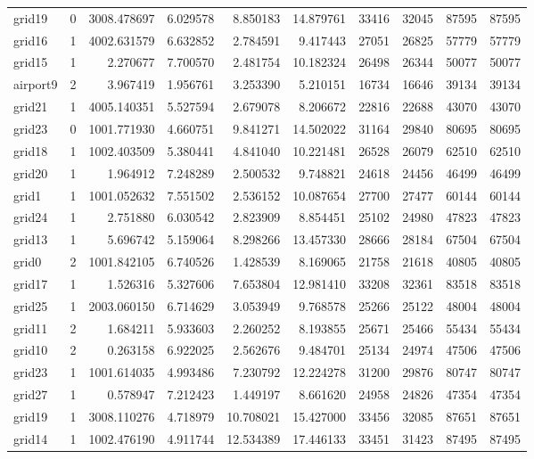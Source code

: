 \begin{longtable}{|l|r|r|r|r|r|r|r|r|r|}
grid19 & 0 & 3008.478697 & 6.029578 & 8.850183 & 14.879761 & 33416 & 32045 & 87595 & 87595 \\
grid16 & 1 & 4002.631579 & 6.632852 & 2.784591 & 9.417443 & 27051 & 26825 & 57779 & 57779 \\
grid15 & 1 & 2.270677 & 7.700570 & 2.481754 & 10.182324 & 26498 & 26344 & 50077 & 50077 \\
airport9 & 2 & 3.967419 & 1.956761 & 3.253390 & 5.210151 & 16734 & 16646 & 39134 & 39134 \\
grid21 & 1 & 4005.140351 & 5.527594 & 2.679078 & 8.206672 & 22816 & 22688 & 43070 & 43070 \\
grid23 & 0 & 1001.771930 & 4.660751 & 9.841271 & 14.502022 & 31164 & 29840 & 80695 & 80695 \\
grid18 & 1 & 1002.403509 & 5.380441 & 4.841040 & 10.221481 & 26528 & 26079 & 62510 & 62510 \\
grid20 & 1 & 1.964912 & 7.248289 & 2.500532 & 9.748821 & 24618 & 24456 & 46499 & 46499 \\
grid1 & 1 & 1001.052632 & 7.551502 & 2.536152 & 10.087654 & 27700 & 27477 & 60144 & 60144 \\
grid24 & 1 & 2.751880 & 6.030542 & 2.823909 & 8.854451 & 25102 & 24980 & 47823 & 47823 \\
grid13 & 1 & 5.696742 & 5.159064 & 8.298266 & 13.457330 & 28666 & 28184 & 67504 & 67504 \\
grid0 & 2 & 1001.842105 & 6.740526 & 1.428539 & 8.169065 & 21758 & 21618 & 40805 & 40805 \\
grid17 & 1 & 1.526316 & 5.327606 & 7.653804 & 12.981410 & 33208 & 32361 & 83518 & 83518 \\
grid25 & 1 & 2003.060150 & 6.714629 & 3.053949 & 9.768578 & 25266 & 25122 & 48004 & 48004 \\
grid11 & 2 & 1.684211 & 5.933603 & 2.260252 & 8.193855 & 25671 & 25466 & 55434 & 55434 \\
grid10 & 2 & 0.263158 & 6.922025 & 2.562676 & 9.484701 & 25134 & 24974 & 47506 & 47506 \\
grid23 & 1 & 1001.614035 & 4.993486 & 7.230792 & 12.224278 & 31200 & 29876 & 80747 & 80747 \\
grid27 & 1 & 0.578947 & 7.212423 & 1.449197 & 8.661620 & 24958 & 24826 & 47354 & 47354 \\
grid19 & 1 & 3008.110276 & 4.718979 & 10.708021 & 15.427000 & 33456 & 32085 & 87651 & 87651 \\
grid14 & 1 & 1002.476190 & 4.911744 & 12.534389 & 17.446133 & 33451 & 31423 & 87495 & 87495 \\

\end{longtable}
